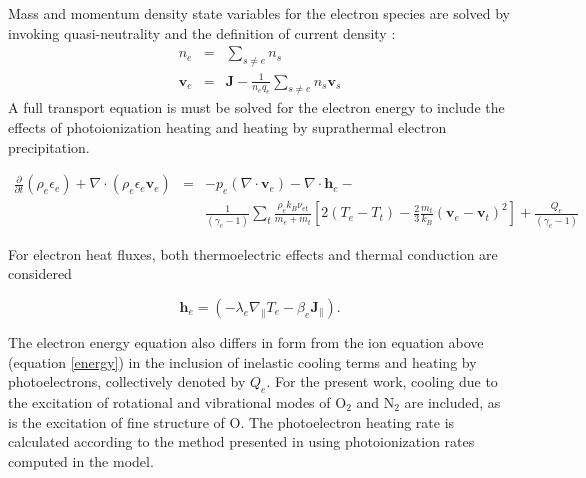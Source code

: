 \documentclass[11pt,letterpaper]{article}
\begin{document}
Mass and momentum density state variables for the electron species are solved by invoking quasi-neutrality and the definition of current density \citep[cf. also][equations 25 and 26]{Zettergren:2012}:
\begin{eqnarray}
n_e &=& \sum_{s \ne e} n_s \label{eqn:quasineu} \\
\mathbf{v}_e &=& \mathbf{J} - \frac{1}{n_e q_e} \sum_{s \ne e} n_s \mathbf{v}_s
\end{eqnarray}
A full transport equation is must be solved for the electron energy to include the effects of photoionization heating and heating by suprathermal electron precipitation. 
\begin{linenomath*} \begin{eqnarray}
\frac{\partial}{\partial t} \left( \rho_e \epsilon_e \right) + \nabla \cdot \left( \rho_e \epsilon_e \mathbf{v}_e \right) &=& - p_e (\nabla \cdot \mathbf{v}_e) - \nabla \cdot \mathbf{h}_e - \\
\nonumber&& \frac{1}{(\gamma_e - 1 )}\sum_t \frac{\rho_e k_B \nu_{et}}{m_e + m_t}\left[ 2 (T_e-T_t) - \frac{2}{3} \frac{m_t}{k_B}(\mathbf{v}_e-\mathbf{v}_t)^2 \right] + \frac{Q_e}{(\gamma_e - 1 )}\label{energye}
\end{eqnarray} \end{linenomath*}
For electron heat fluxes, both thermoelectric effects \citep{Schunk:1978} and thermal conduction are considered \citep{Banks:1973,Huba:2000}
\begin{linenomath*} \begin{equation}
\mathbf{h}_e = \left( - \lambda_e \nabla_{\parallel} T_e - \beta_e \mathbf{J}_{\parallel} \right).
\end{equation} \end{linenomath*}
The electron energy equation also differs in form from the ion equation above (equation \ref{energy}) in the inclusion of inelastic cooling terms and heating by photoelectrons, collectively denoted by $Q_e$. For the present work, cooling due to the excitation of rotational and vibrational modes of O$_2$ and N$_2$ are included, as is the excitation of fine structure of O. The photoelectron heating rate is calculated according to the method presented in \citet{Swartz:1972} using photoionization rates computed in the model.

\end{document}
